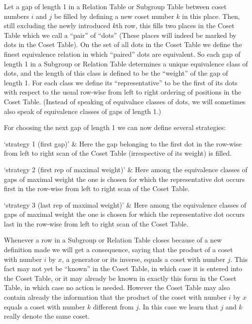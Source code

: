 Let a gap of length 1 in a Relation Table or Subgroup Table between
coset numbers $i$ and $j$ be filled by defining a new coset number $k$
in this place. Then, still excluding the newly introduced $k$th row,
this fills two places in the Coset Table which we call a ``pair'' of
``dots'' (These places will indeed be marked by dots in the {\ITC} Coset
Table). On the set of all dots in the Coset Table we define the
finest equivalence relation in which ``paired'' dots are equivalent. So
each gap of length 1 in a Subgroup or Relation Table determines a
unique equivalence class of dots, and the length of this class is
defined to be the ``weight'' of the gap of length 1. For each class we
define its ``representative'' to be the first of its dots with respect
to the usual row-wise from left to right ordering of positions in the
Coset Table. (Instead of speaking of equivalnce classes of dots, we
will sometimes also speak of equivalence classes of gaps of length 1.)

For choosing the next gap of length 1 we can now define several
strategies:

\beginitems

`strategy 1 (first gap)' &
  Here the gap belonging to the first dot in the row-wise from left to
  right scan of the Coset Table (irrespective of its weight) is filled.

`strategy 2 (first rep of maximal weight)' &
  Here among the equivalence classes of gaps of maximal weight the one
  is chosen for which the representative dot occurs first in the
  row-wise from left to right scan of the Coset Table.

`strategy 3 (last rep of maximal weight)' &
  Here among the equivalence classes of gaps of maximal weight the one
  is chosen for which the representative dot occurs last in the
  row-wise from left to right scan of the Coset Table.

\enditems



Whenever a row in a Subgroup or Relation Table closes because of a new
definition made we will get a consequence, saying that the product of
a coset with number $i$ by $x$, a generator or its inverse, equals a
coset with number $j$. This fact may not yet be ``known'' in the Coset
Table, in which case it is entered into the Coset Table, or it may
already be known in exactly this form in the Coset Table, in which
case no action is needed. However the Coset Table may also contain
already the information that the product of the coset with number $i$
by $x$ equals a coset with number $k$ different from $j$. In this
case we learn that $j$ and $k$ really denote the same coset.

